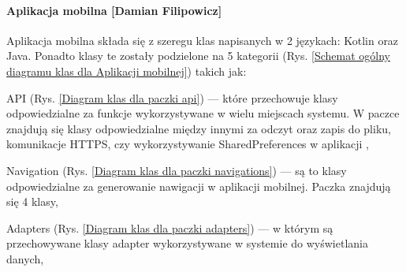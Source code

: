		\paragraph{Aplikacja mobilna [Damian Filipowicz]}
		Aplikacja mobilna składa się z szeregu klas napisanych w 2 językach: Kotlin oraz Java. Ponadto klasy te zostały podzielone na 5 kategorii (Rys. \ref{Schemat ogólny diagramu klas dla Aplikacji mobilnej}) takich jak:
		\begin{itemize*}
			\item API 
			(Rys. \ref{Diagram klas dla paczki api}) 
			---  które przechowuje klasy odpowiedzialne za funkcje wykorzystywane w wielu miejscach systemu. W paczce znajdują się klasy odpowiedzialne między innymi za odczyt oraz zapis do pliku, komunikacje HTTPS, czy wykorzystywanie SharedPreferences w aplikacji ,
			\item Navigation 
			(Rys. \ref{Diagram klas dla paczki navigations}) 
			--- są to klasy odpowiedzialne za generowanie nawigacji w aplikacji mobilnej. Paczka znajdują się 4 klasy,
			\item Adapters
			(Rys. \ref{Diagram klas dla paczki adapters}) 
			 --- w którym są przechowywane klasy adapter wykorzystywane w systemie do wyświetlania danych,
		\end{itemize*}
	
